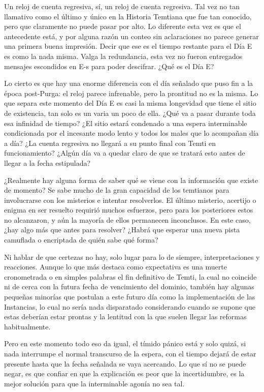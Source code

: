 \documentclass[
  spanish,
]{book}
\begin{document}
Un reloj de cuenta regresiva, sí, un reloj de cuenta regresiva. Tal vez no tan llamativo como el último y único en la Historia Temtiana que fue tan conocido, pero que claramente no puede pasar por alto. Lo diferente esta vez es que el antecedente está, y por alguna razón un conteo sin aclaraciones no parece generar una primera buena impresión. Decir que ese es el tiempo restante para el Día E es como la nada misma. Valga la redundancia, esta vez no fueron entregados mensajes escondidos en E-s para poder descifrar. ¿Qué es el Día E?

Lo cierto es que hay una enorme diferencia con el día señalado que puso fin a la época post-Purga: el reloj parece infrenable, pero la prontitud no es la misma. Lo que separa este momento del Día E es casi la misma longevidad que tiene el sitio de existencia, tan solo es un varia un poco de ella. ¿Qué va a pasar durante toda esa infinidad de tiempo? ¿El sitio estará condenado a una espera interminable condicionada por el incesante modo lento y todos los males que lo acompañan día a día? ¿La cuenta regresiva no llegará a su punto final con Temti en funcionamiento? ¿Algún día va a quedar claro de que se tratará esto antes de llegar a la fecha estipulada?

¿Realmente hay alguna forma de saber qué se viene con la información que existe de momento? Se sabe mucho de la gran capacidad de los temtianos para involucrarse con los misterios e intentar resolverlos. El último misterio, acertijo o enigma en ser resuelto requirió muchos esfuerzos, pero para los posteriores estos no alcanzaron, y aún la mayoría de ellos permanecen inconclusos. En este caso, ¿hay algo más que antes para resolver? ¿Habrá que esperar una nueva pista camuflada o encriptada de quién sabe qué forma?

Ni hablar de que certezas no hay, solo lugar para lo de siempre, interpretaciones y reacciones. Aunque lo que más destaca como expectativa es una muerte cronometrada o en simples palabras el fin definitivo de Temti, la cual no coincide ni de cerca con la futura fecha de vencimiento del dominio, también hay algunas pequeñas minorías que postulan a este futuro día como la implementación de las Instancias, lo cual no sería nada disparatado considerando cuando se supone que estas deberían estar prontas y la lentitud con la que suelen llegar las reformas habitualmente.

Pero en este momento todo eso da igual, el tímido pánico está y solo quizá, si nada interrumpe el normal transcurso de la espera, con el tiempo dejará de estar presente hasta que la fecha señalada se vaya acercando. Lo que sí no se puede negar, es que confiar en que la explicación es peor que la incertidumbre, es la mejor solución para que la interminable agonía no sea tal.
\end{document}
